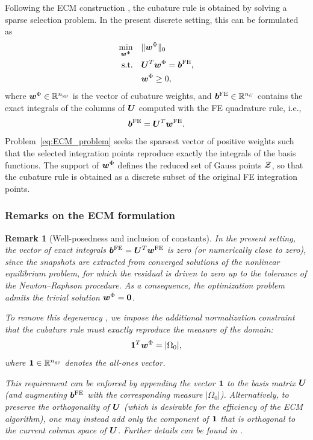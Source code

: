 \documentclass[11pt,a4paper]{article}
\newtheorem{remark}{Remark}
\newcommand{\PROMPT}[1]{ }
\begin{document}
Following the ECM construction \cite{hernandez2024cecm}, the cubature rule is
obtained by solving a sparse selection problem. In the present discrete setting,
this can be formulated as
\begin{equation}
\label{eq:ECM_problem}
\begin{aligned}
    \min_{\bm{w}^{\Phi}} \quad & \|\bm{w}^{\Phi}\|_0 \\
    \text{s.t.} \quad & \bm{U}^T \bm{w}^{\Phi} = \bm{b}^{\mathrm{FE}}, \\
                      & \bm{w}^{\Phi} \ge 0,
\end{aligned}
\end{equation}
where $\bm{w}^{\Phi} \in \mathbb{R}^{n_{\mathrm{gp}}}$ is the vector of cubature weights, and
$\bm{b}^{\mathrm{FE}} \in \mathbb{R}^{n_U}$ contains the exact integrals of the columns of
$\bm{U}$ computed with the FE quadrature rule, i.e.,
\begin{equation}
    \bm{b}^{\mathrm{FE}} = \bm{U}^T \bm{w}^{\mathrm{FE}}.
\end{equation}
Problem~\eqref{eq:ECM_problem} seeks the sparsest vector of positive weights such
that the selected integration points reproduce exactly the integrals of the
basis functions. The support of $\bm{w}^{\Phi}$ defines the reduced set of Gauss points
$\mathcal{Z}$, so that the cubature rule is obtained as a discrete subset of the
original FE integration points.


\PROMPT{}

%
%
\subsubsection{Remarks on the ECM formulation}
\label{subsec:remarks_ECM}

\begin{remark}[Well-posedness and inclusion of constants]
In the present setting, the vector of exact integrals $\bm{b}^{\mathrm{FE}}=\bm{U}^T\bm{w}^{\mathrm{FE}}$ is zero
(or numerically close to zero), since the snapshots are extracted from
converged solutions of the nonlinear equilibrium problem, for which the residual
is driven to zero up to the tolerance of the Newton--Raphson procedure. As a
consequence, the optimization problem admits the trivial solution
$\bm{w}^{\Phi}=\bm{0}$.

To remove this degeneracy \cite{hernandez2017dimensional}, we impose the
additional normalization constraint that the cubature rule must exactly
reproduce the measure of the domain:
\begin{equation}
    \bm{1}^T \bm{w}^{\Phi} = |\Omega_0|,
\end{equation}
where $\bm{1} \in \mathbb{R}^{n_{\mathrm{gp}}}$ denotes the all-ones vector.

This requirement can be enforced by appending the vector $\bm{1}$ to the basis
matrix $\bm{U}$ (and augmenting $\bm{b}^{\mathrm{FE}}$ with the corresponding measure
$|\Omega_0|$). Alternatively, to preserve the orthogonality of $\bm{U}$ (which is
desirable for the efficiency of the ECM algorithm), one may instead add only the
component of $\bm{1}$ that is orthogonal to the current column space of
$\bm{U}$. Further details can be found in
\cite{hernandez2017dimensional,hernandez2024cecm}.
\end{remark}
\end{document}
